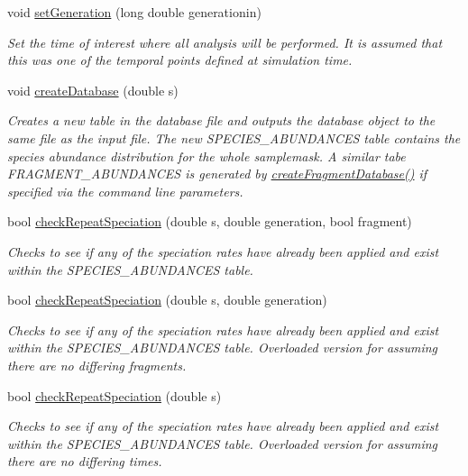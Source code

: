 \begin{DoxyCompactItemize}
void \hyperlink{class_treelist_a3bdea04b963ec5a92711d5f389a534c2}{set\+Generation} (long double generationin)
\begin{DoxyCompactList}\small\item\em Set the time of interest where all analysis will be performed. It is assumed that this was one of the temporal points defined at simulation time. \end{DoxyCompactList}\item 
void \hyperlink{class_treelist_a3416c2a81ee64b98b3d7956f58a8132d}{create\+Database} (double s)
\begin{DoxyCompactList}\small\item\em Creates a new table in the database file and outputs the database object to the same file as the input file. The new S\+P\+E\+C\+I\+E\+S\+\_\+\+A\+B\+U\+N\+D\+A\+N\+C\+ES table contains the species abundance distribution for the whole samplemask. A similar tabe F\+R\+A\+G\+M\+E\+N\+T\+\_\+\+A\+B\+U\+N\+D\+A\+N\+C\+ES is generated by \hyperlink{class_treelist_aba14303915c31c334e1d63ae61c3812c}{create\+Fragment\+Database()} if specified via the command line parameters. \end{DoxyCompactList}\item 
bool \hyperlink{class_treelist_a729efcf34c00e6dfbf45a6fb17cab0ca}{check\+Repeat\+Speciation} (double s, double generation, bool fragment)
\begin{DoxyCompactList}\small\item\em Checks to see if any of the speciation rates have already been applied and exist within the S\+P\+E\+C\+I\+E\+S\+\_\+\+A\+B\+U\+N\+D\+A\+N\+C\+ES table. \end{DoxyCompactList}\item 
bool \hyperlink{class_treelist_af8bf1c31280aac49f5863b22373d17ca}{check\+Repeat\+Speciation} (double s, double generation)
\begin{DoxyCompactList}\small\item\em Checks to see if any of the speciation rates have already been applied and exist within the S\+P\+E\+C\+I\+E\+S\+\_\+\+A\+B\+U\+N\+D\+A\+N\+C\+ES table. Overloaded version for assuming there are no differing fragments. \end{DoxyCompactList}\item 
bool \hyperlink{class_treelist_a08e810576f6294def9e958a20352ad94}{check\+Repeat\+Speciation} (double s)
\begin{DoxyCompactList}\small\item\em Checks to see if any of the speciation rates have already been applied and exist within the S\+P\+E\+C\+I\+E\+S\+\_\+\+A\+B\+U\+N\+D\+A\+N\+C\+ES table. Overloaded version for assuming there are no differing times. \end{DoxyCompactList}\item 

\end{DoxyCompactItemize}
